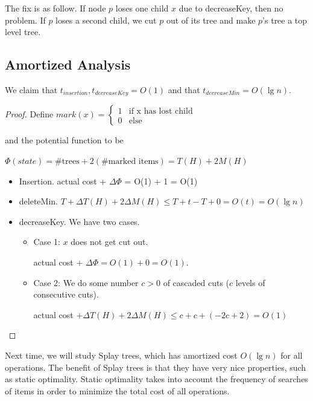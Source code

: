 \documentclass[11pt]{article}
\begin{document}
The fix is as follow. If node $p$ loses one child $x$ due to decreaseKey, then no problem. If $p$ loses a second child, we cut $p$ out of its tree and make $p$'s tree a top level tree.

\subsection{Amortized Analysis}
We claim that  $t_{insertion}, t_{decreaseKey} = O(1)$ and that $t_{decreaseMin} = O(\lg n)$.

\begin{proof}
Define $mark(x) = \begin{cases} 1& \mbox{if x has lost child} \\
 0 & \mbox{else}
  \end{cases}
 $ 
 
 and the potential function to be 

$\Phi(state) = \mbox{\# trees} + 2 (\mbox{\# marked items}) = T(H) + 2 M(H)$

\begin{itemize}

\item Insertion. actual cost + $\Delta \Phi$ = O(1) + 1 = O(1)

\item deleteMin. $T + \Delta T(H) + 2\Delta M(H) \leq T + t- T + 0 = O(t) = O(\lg n)$

\item decreaseKey. We have two cases.
\begin{itemize} 
\item Case 1: $x$ does not get cut out.

actual cost + $\Delta \Phi = O(1) + 0 = O(1)$.

\item Case 2: We do some number $c > 0$ of cascaded cuts ($c$ levels of consecutive cuts). 

actual cost $+ \Delta T(H) + 2 \Delta M(H) \leq 
           c     +             c          +  ( - 2c + 2) = O(1)$
\end{itemize}
\end{itemize}

\end{proof}


Next time, we will study Splay trees, which has amortized cost $O(\lg n)$ for all operations. The benefit of Splay trees is that they have very nice properties, such as static optimality. Static optimality takes into account the frequency of searches of items in order to minimize the total cost of all operations.
\end{document}
